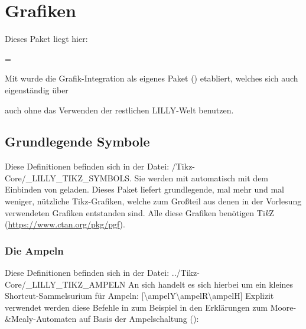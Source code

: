 \normalmarginpar

\renewcommand{\arraystretch}{1.5}
\chapter[Grafiken \LILLYxBOXxVersion{\small 1.0.0}]{Grafiken}
Dieses Paket liegt hier: \begin{center}
     = \T{\LILLYxPATHxGRAPHICS}
\end{center}
\begin{bemerkung}
    Mit  wurde die Grafik-Integration als eigenes Paket () etabliert, welches sich auch eigenständig über \begin{latex}
\usepackage{LILLYxGRAPHICS}
        \end{latex}
        auch ohne das Verwenden der restlichen LILLY-Welt benutzen.
\end{bemerkung}
%
%
%
\section{Grundlegende Symbole}
Diese Definitionen befinden sich in der Datei: {\ltt\LILLYxPATHxGRAPHICS/Tikz-Core/\_LILLY\_TIKZ\_SYMBOLS}. Sie werden mit  automatisch mit dem Einbinden von\newline {} geladen.\medskip\newline
Dieses Paket liefert grundlegende, mal mehr und mal weniger, nützliche Tikz-Grafiken, welche zum Großteil aus denen in der Vorlesung verwendeten Grafiken entstanden sind. Alle diese Grafiken benötigen Ti\textit{k}Z (\url{https://www.ctan.org/pkg/pgf}).
\subsection{Die Ampeln}
Diese Definitionen befinden sich in der Datei: {\ltt../Tikz-Core/\_LILLY\_TIKZ\_AMPELN}
An sich handelt es sich hierbei um ein kleines Shortcut-Sammelsurium für Ampeln:\medskip
%
%
%
[\cmdlist \textbackslash ampelY\cmdlist \textbackslash ampelR\cmdlist \textbackslash ampelH]
Explizit verwendet werden diese Befehle in zum Beispiel in den Erklärungen zum Moore-\&Mealy-Automaten auf Basis der Ampelschaltung (\!\ampelG\ampelY\ampelH):

